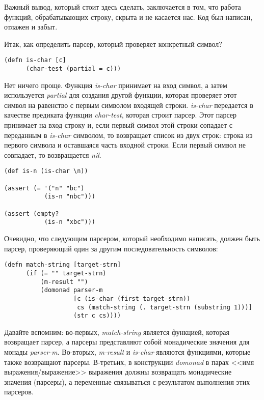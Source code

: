 \documentclass[a4paper,12pt]{article}
\newcommand{\cl}[1] {{\it #1}}
\begin{document}
Важный вывод, который стоит здесь сделать, заключается в том, что работа функций, обрабатывающих строку,
скрыта и не касается нас. Код был написан, отлажен и забыт. 

Итак, как определить парсер, который проверяет конкретный символ?

\begin{verbatim}
(defn is-char [c]
      (char-test (partial = c)))
\end{verbatim}

Нет ничего проще.
Функция \cl{is-char} принимает на вход символ, а затем используется \cl{partial} для создания
другой функции, которая проверяет этот символ на равенство с первым символом входящей строки. \cl{is-char} передается 
в качестве предиката функции \cl{char-test}, которая строит парсер. Этот парсер принимает на вход строку и, 
если первый символ этой строки сопадает с переданным в \cl{is-char} символом, то возвращает список из двух строк: 
строка из первого символа и оставшаяся часть входной строки. Если первый символ не совпадает, то возвращается
\cl{nil}.

\begin{verbatim}
(def is-n (is-char \n))

(assert (= '("n" "bc")
           (is-n "nbc")))

(assert (empty?
           (is-n "xbc")))
\end{verbatim}

Очевидно, что следующим парсером, который необходимо написать, должен быть парсер, проверяющий
один за другим последовательность символов: 

\begin{verbatim}
(defn match-string [target-strn]
      (if (= "" target-strn)
          (m-result "")
          (domonad parser-m
                   [c (is-char (first target-strn))
                    cs (match-string (. target-strn (substring 1)))]
                   (str c cs))))
\end{verbatim}

Давайте вспомним: 
во-первых, \cl{match-string} является функцией, которая возвращает парсер, 
а парсеры представляют собой монадические значения для монады \cl{parser-m}. 
Во-вторых, \cl{m-result} и \cl{is-char} являются функциями, которые также возвращают парсеры. 
В-третьих, в конструкции \cl{domonad} в парах <<имя выражения/выражение>> выражения должны возвращать
монадические значения (парсеры), а переменные связываться с результатом выполнения этих парсеров. 
\end{document}
